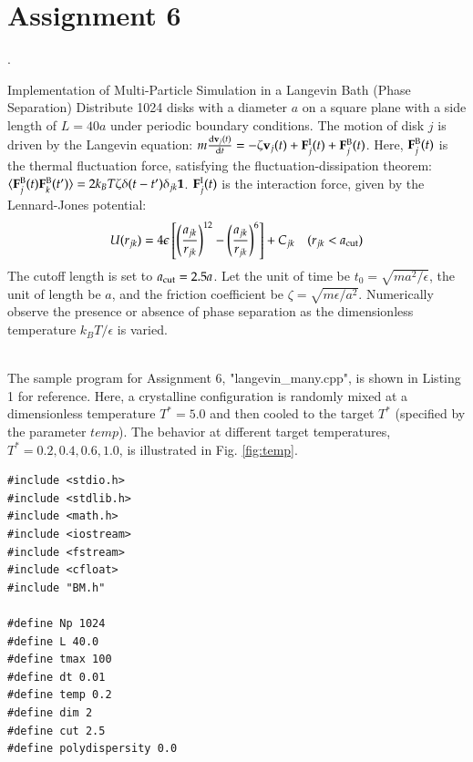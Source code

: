\documentclass[aspectratio=169,dvipdfmx,cjk,handout,hyperref,8pt]{beamer} %
\newcommand{\TK}[1]{{\bf \color{red} #1}}
\newcommand{\tk}[1]{{\bf \color{blue} #1}}
\theoremstyle{example}
\newcommand{\be}{\begin{equation}}
\newcommand{\ee}{\end{equation}}
\newcommand{\odif}[2]{\frac{{\rm d} #1}{{\rm d} #2}}
\begin{document}
\section{Assignment 6}
\begin{frame}{\thesection.~\insertsection}  
\begin{exampleblock}{ Implementation of Multi-Particle Simulation in a Langevin Bath (Phase Separation)}
Distribute 1024 disks with a diameter $a$ on a square plane with a side length of $L=40a$ under periodic boundary conditions. The motion of disk $j$ is driven by the Langevin equation:
$m\odif{{\bf v}_j(t)}{t} = -\zeta {\bf v}_j(t) + {\bf F}^{\rm I}_j(t) + {\bf F}^{\rm B}_j(t)$.
Here, ${\bf F}^{\rm B}_j(t)$ is the thermal fluctuation force, satisfying the fluctuation-dissipation theorem:
$\langle {\bf F}^{\rm B}_j(t) {\bf F}^{\rm B}_k(t')\rangle = 2k_BT\zeta \delta(t-t')\delta_{jk} {\bf 1}$.
${\bf F}^{\rm I}_j(t)$ is the interaction force, given by the Lennard-Jones potential:
\be
U(r_{jk}) = 4\epsilon\left[\left(\frac{a_{jk}}{r_{jk}}\right)^{12}-\left(\frac{a_{jk}}{r_{jk}}\right)^{6}\right] + C_{jk} \quad (r_{jk}<a_{\rm cut})
\ee
The cutoff length is set to $a_{\rm cut} = 2.5a$. Let the unit of time be $t_0 = \sqrt{ma^2/\epsilon}$, the unit of length be $a$, and the friction coefficient be $\zeta = \sqrt{m\epsilon/a^2}$. Numerically observe the presence or absence of phase separation as the dimensionless temperature $k_BT/\epsilon$ is varied.
\end{exampleblock}
\noindent\tk{\fbox{Solution}}\\
The sample program for Assignment 6, "langevin\_many.cpp", is shown in Listing 1 for reference. Here, a crystalline configuration is randomly mixed at a dimensionless temperature $T^* = 5.0$ and then cooled to the target $T^*$ (specified by the parameter $temp$). The behavior at different target temperatures, $T^* = 0.2, 0.4, 0.6, 1.0$, is illustrated in Fig. \ref{fig:temp}.


\begin{lstlisting}[basicstyle=\ttfamily\small, breaklines=true, frame=single,caption= Sample program for independent assignment 6: “langevin\_many.cpp”.
Available from the following GitHub repository \href{https://github.com/TakeshiKawasaki/2026-simulation-tutorial/tree/main/Lecture7}{\TK{\underbar{[Link]}}}.]
#include <stdio.h>
#include <stdlib.h>
#include <math.h>
#include <iostream>
#include <fstream>
#include <cfloat>
#include "BM.h"

#define Np 1024
#define L 40.0
#define tmax 100
#define dt 0.01
#define temp 0.2
#define dim 2
#define cut 2.5
#define polydispersity 0.0


\end{lstlisting}
\end{frame}
\end{document}
